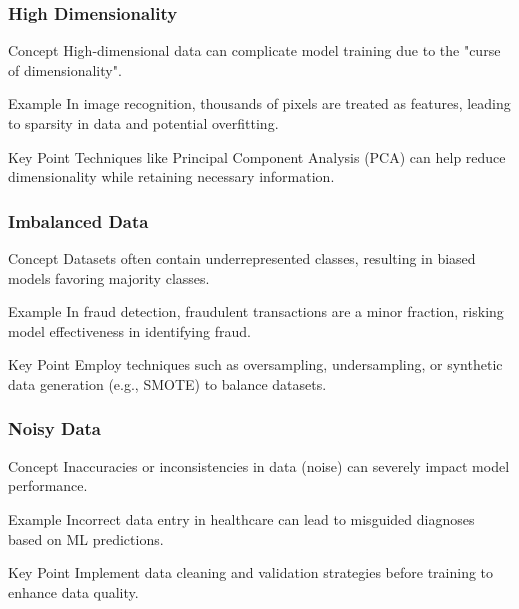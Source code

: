 \documentclass[aspectratio=169]{beamer}
\begin{document}
\begin{frame}[fragile]
    \frametitle{High Dimensionality}
    \begin{block}{Concept}
        High-dimensional data can complicate model training due to the "curse of dimensionality". 
    \end{block}
    \begin{exampleblock}{Example}
        In image recognition, thousands of pixels are treated as features, leading to sparsity in data and potential overfitting.
    \end{exampleblock}
    \begin{block}{Key Point}
        Techniques like Principal Component Analysis (PCA) can help reduce dimensionality while retaining necessary information.
    \end{block}
\end{frame}

\begin{frame}[fragile]
    \frametitle{Imbalanced Data}
    \begin{block}{Concept}
        Datasets often contain underrepresented classes, resulting in biased models favoring majority classes.
    \end{block}
    \begin{exampleblock}{Example}
        In fraud detection, fraudulent transactions are a minor fraction, risking model effectiveness in identifying fraud.
    \end{exampleblock}
    \begin{block}{Key Point}
        Employ techniques such as oversampling, undersampling, or synthetic data generation (e.g., SMOTE) to balance datasets.
    \end{block}
\end{frame}

\begin{frame}[fragile]
    \frametitle{Noisy Data}
    \begin{block}{Concept}
        Inaccuracies or inconsistencies in data (noise) can severely impact model performance.
    \end{block}
    \begin{exampleblock}{Example}
        Incorrect data entry in healthcare can lead to misguided diagnoses based on ML predictions.
    \end{exampleblock}
    \begin{block}{Key Point}
        Implement data cleaning and validation strategies before training to enhance data quality.
    \end{block}
\end{frame}
\end{document}
